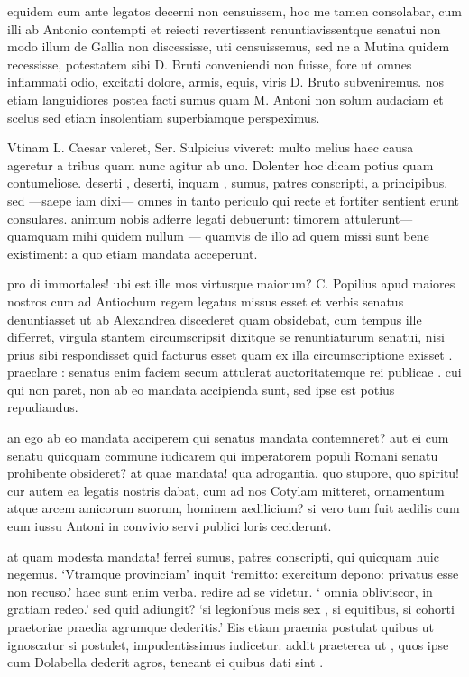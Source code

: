  equidem cum ante legatos decerni non censuissem, hoc me tamen consolabar, cum illi ab Antonio contempti et reiecti revertissent renuntiavissentque senatui non modo illum de Gallia non discessisse, uti censuissemus, sed ne a Mutina quidem recessisse, potestatem sibi D. Bruti conveniendi non fuisse, fore ut omnes inflammati odio, excitati dolore, armis, equis, viris D. Bruto subveniremus. nos etiam languidiores postea facti sumus quam M. Antoni non solum audaciam et scelus sed etiam insolentiam superbiamque perspeximus.

 Vtinam L. Caesar valeret, Ser. Sulpicius viveret: multo melius haec causa ageretur a tribus quam nunc agitur ab uno. Dolenter hoc dicam potius quam contumeliose. deserti , deserti, inquam , sumus, patres conscripti, a principibus. sed —saepe iam dixi— omnes in tanto periculo qui recte et fortiter sentient erunt consulares. animum nobis adferre legati debuerunt: timorem attulerunt—quamquam mihi quidem nullum — quamvis de illo ad quem missi sunt bene existiment: a quo etiam mandata acceperunt.

 pro di immortales! ubi est ille mos virtusque maiorum? C. Popilius apud maiores nostros cum ad Antiochum regem legatus missus esset et verbis senatus denuntiasset ut ab Alexandrea discederet quam obsidebat, cum tempus ille differret, virgula stantem circumscripsit dixitque se renuntiaturum senatui, nisi prius sibi respondisset quid facturus esset quam ex illa circumscriptione exisset . praeclare : senatus enim faciem secum attulerat auctoritatemque rei publicae . cui qui non paret, non ab eo mandata accipienda sunt, sed ipse est potius repudiandus.

 an ego ab eo mandata acciperem qui senatus mandata contemneret? aut ei cum senatu quicquam commune iudicarem qui imperatorem populi Romani senatu prohibente obsideret? at quae mandata! qua adrogantia, quo stupore, quo spiritu! cur autem ea legatis nostris dabat, cum ad nos Cotylam mitteret, ornamentum atque arcem amicorum suorum, hominem aedilicium? si vero tum fuit aedilis cum eum iussu Antoni in convivio servi publici loris ceciderunt.

 at quam modesta mandata! ferrei sumus, patres conscripti, qui quicquam huic negemus. `Vtramque provinciam' inquit `remitto: exercitum depono: privatus esse non recuso.' haec sunt enim verba. redire ad se videtur. ` omnia obliviscor, in gratiam redeo.' sed quid adiungit? `si legionibus meis sex , si equitibus, si cohorti praetoriae praedia agrumque dederitis.' Eis etiam praemia postulat quibus ut ignoscatur si postulet, impudentissimus iudicetur. addit praeterea ut , quos ipse cum Dolabella dederit agros, teneant ei quibus dati sint .

